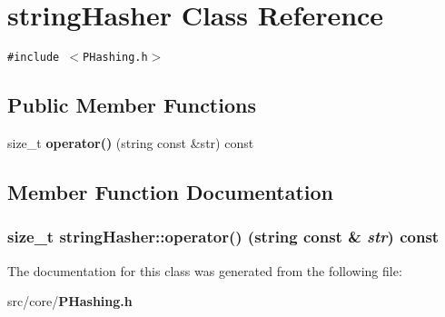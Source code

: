 \section{string\-Hasher Class Reference}
\label{classstringHasher}
{\tt \#include $<$PHashing.h$>$}

\subsection*{Public Member Functions}
\begin{CompactItemize}
\item 
size\_\-t {\bf operator()} (string const \&str) const 
\end{CompactItemize}


\subsection{Member Function Documentation}
\subsubsection{\setlength{\rightskip}{0pt plus 5cm}size\_\-t string\-Hasher::operator() (string const \& {\em str}) const\hspace{0.3cm}{\tt  [inline]}}\label{classstringHasher_6f8bd38046e587f5b01cc8fb76a26553}




The documentation for this class was generated from the following file:\begin{CompactItemize}
\item 
src/core/{\bf PHashing.h}\end{CompactItemize}
